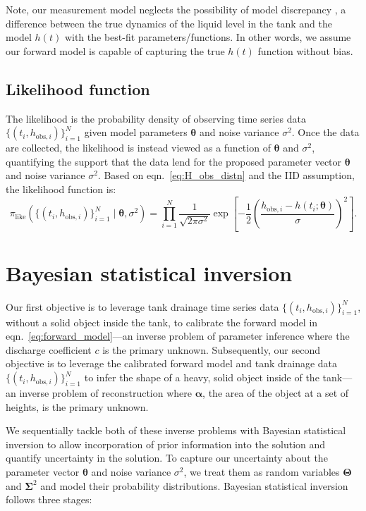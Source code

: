 \documentclass[openacc]{rsproca_new}%
\newcommand\thedata {$\{(t_i,h_{\text{obs}, i})\}_{i=1}^{N}$\xspace}
\newcommand\thedatanomath {\{(t_i,h_{\text{obs}, i})\}_{i=1}^{N}}
\begin{document}
Note, our measurement model neglects the possibility of model discrepancy \cite{brynjarsdottir2014learning,kennedy2001bayesian}, a difference between the true dynamics of the liquid level in the tank and the model $h(t)$ with the best-fit parameters/functions. In other words, we assume our forward model is capable of capturing the true $h(t)$ function without bias.


\subsection{Likelihood function}
The likelihood is the probability density of observing time series data \thedata given model parameters $\boldsymbol \theta$ and noise variance $\sigma^2$. Once the data are collected, the likelihood is instead viewed as a function of $\boldsymbol \theta$ and $\sigma^2$, quantifying the support that the data lend for the proposed parameter vector $\boldsymbol \theta$ and noise variance $\sigma^2$. Based on eqn.~\ref{eq:H_obs_distn} and the IID assumption, the likelihood function is:
\begin{equation}
 \pi_{\text{like}}(\thedatanomath \mid \boldsymbol \theta, \sigma^2 ) = \prod_{i=1}^N \frac{1}{\sqrt{2\pi\sigma^2}} \exp \left[-\frac{1}{2}\left(\frac{h_{\text{obs}, i} - h(t_i; \boldsymbol\theta)}{\sigma} \right)^2 \right]. \label{eq:like}
\end{equation}

\section{Bayesian statistical inversion}
Our first objective is to leverage tank drainage time series data \thedata, without a solid object inside the tank, to calibrate the forward model in eqn.~\ref{eq:forward_model}---an inverse problem of parameter inference where the discharge coefficient $c$ is the primary unknown.
Subsequently, our second objective is to leverage the calibrated forward model and tank drainage data \thedata to infer the shape of a heavy, solid object inside of the tank---an inverse problem of reconstruction where $\boldsymbol \alpha$, the area of the object at a set of heights, is the primary unknown. 

We sequentially tackle both of these inverse problems with Bayesian statistical inversion \cite{calvetti2018inverse,waqar2023tutorial,kaipio2006statistical} to allow incorporation of prior information into the solution and quantify uncertainty in the solution.
To capture our uncertainty about the parameter vector $\boldsymbol \theta$ and noise variance $\sigma^2$, we treat them as random variables $\boldsymbol \Theta$ and $\boldsymbol \Sigma^2$ and model their probability distributions. Bayesian statistical inversion follows three stages:
\end{document}
